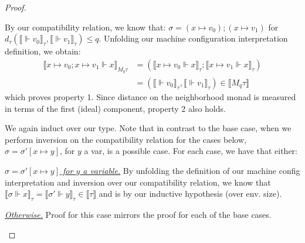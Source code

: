 \begin{proof}
\begin{description}
\begin{description}
\begin{description}
            By our compatibility relation, we know that: $\sigma = (x \mapsto
            v_0);(x \mapsto v_1)$ for $d_{\tau}(\llbracket \Vdash v_0
            \rrbracket_{\tau}, \llbracket \Vdash v_1 \rrbracket_{\tau}) \leq q$.
            Unfolding our machine configuration interpretation definition, we
            obtain:
            \begin{equation*}
              \begin{aligned}
                \llbracket x \mapsto v_0; x \mapsto v_1 \Vdash x \rrbracket_{M_q
                \tau} &= (\llbracket x \mapsto v_0 \Vdash x \rrbracket_{\tau};
                \llbracket x \mapsto v_1 \Vdash x \rrbracket_{\tau}) \\
                &= (\llbracket \Vdash v_0 \rrbracket_{\tau}, \llbracket \Vdash
                v_1 \rrbracket_{\tau}) \in \llbracket M_q \tau \rrbracket
              \end{aligned}
            \end{equation*}
            which proves property 1. Since distance on the neighborhood monad is
            measured in terms of the first (ideal) component, property 2 also
            holds.
        \end{description}
      \item[\textit{(env. size) n + 1.}] We again induct over our type. 
        Note that in contrast to the base case, when we perform inversion on the
        compatibility relation for the cases below, $\sigma = \sigma'[x \mapsto
        y]$, for $y$ a var, is a possible case. 
        For each case, we have that either:
        \begin{description}
          \item{\underline{\textit{$\sigma = \sigma'[x \mapsto y]$ for $y$ a
            variable.}}} By unfolding the definition of our machine config
            interpretation and inversion over our compatibility relation, we
            know that $\llbracket \sigma \Vdash x \rrbracket_{\tau} = \llbracket
            \sigma' \Vdash y \rrbracket_{\tau} \in \llbracket \tau \rrbracket$
            and is  by our inductive hypothesis (over env.
            size).
          \item{\underline{\textit{Otherwise.}}} Proof for this case mirrors the
            proof for each of the base cases.
        \end{description}
    \end{description}
  \item[\textsc{(ty. rule) Ret.}] 

\end{description}
\end{proof}
